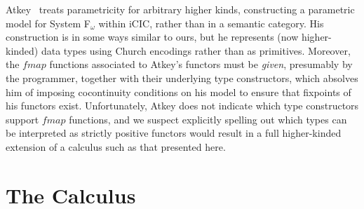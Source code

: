\documentclass[runningheads]{llncs}
\newcommand{\map}{\mathsf{map}}
\begin{document}
Atkey~\cite{atk12} treats parametricity for arbitrary higher kinds,
constructing a parametric model for System F$_\omega$ within iCIC,
rather than in a semantic category. His construction is in some ways
similar to ours, but he represents (now higher-kinded) data types
using Church encodings rather than as primitives. Moreover, the
$\mathit{fmap}$ functions associated to Atkey's functors must be {\em
  given}, presumably by the programmer, together with their underlying
type constructors, which absolves him of imposing cocontinuity
conditions on his model to ensure that fixpoints of his functors
exist.  Unfortunately, Atkey does not indicate which type constructors
support $\mathit{fmap}$ functions, and we suspect explicitly spelling
out which types can be interpreted as strictly positive functors would
result in a full higher-kinded extension of a calculus such as that
presented here.



\vspace*{-0.1in}

\section{The Calculus}\label{sec:calculus}

\vspace*{-0.07in}
\end{document}
